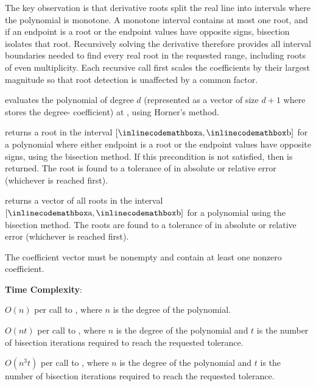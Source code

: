 The key observation is that derivative roots split the real line into intervals where the polynomial is monotone. A monotone interval contains at most one root, and if an endpoint is a root or the endpoint values have opposite signs, bisection isolates that root. Recursively solving the derivative therefore provides all interval boundaries needed to find every real root in the requested range, including roots of even multiplicity. Each recursive call first scales the coefficients by their largest magnitude so that root detection is unaffected by a common factor.

\begin{compactitem}
  \item {} evaluates the polynomial  of degree $d$ (represented as a vector of size $d + 1$ where  stores the degree- coefficient) at , using Horner's method.
  \item {} returns a root in the interval $[{\inlinecodemath{a}}, {\inlinecodemath{b}}]$ for a polynomial  where either endpoint is a root or the endpoint values have opposite signs, using the bisection method. If this precondition is not satisfied, then  is returned. The root is found to a tolerance of  in absolute or relative error (whichever is reached first).
  \item {} returns a vector of all roots in the interval $[{\inlinecodemath{a}}, {\inlinecodemath{b}}]$ for a polynomial  using the bisection method. The roots are found to a tolerance of  in absolute or relative error (whichever is reached first).
\end{compactitem}

The coefficient vector must be nonempty and contain at least one nonzero coefficient.

\textbf{Time Complexity}:
\begin{compactitem}
  \item $O(n)$ per call to , where $n$ is the degree of the polynomial.
  \item $O(nt)$ per call to , where $n$ is the degree of the polynomial and $t$ is the number of bisection iterations required to reach the requested tolerance.
  \item $O(n^{3} t)$ per call to , where $n$ is the degree of the polynomial and $t$ is the number of bisection iterations required to reach the requested tolerance.
\end{compactitem}

